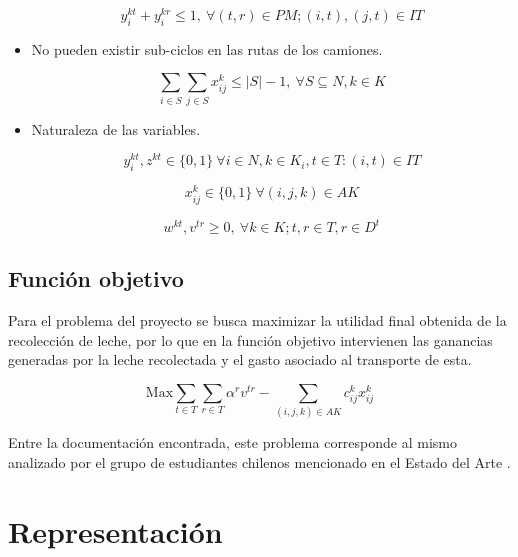 \documentclass[letter, 10pt]{article}
\begin{document}
\begin{itemize}
     \begin{equation}
         y^{kt}_i + y^{kr}_i \leq 1, \: \forall (t,r) \in PM; (i,t),(j,t) \in IT
     \end{equation}
     
     \item No pueden existir sub-ciclos en las rutas de los camiones.
     
     \begin{equation}
         \sum_{i \in S} \sum_{j \in S} x^k_{ij} \leq |S| - 1, \: \forall S \subseteq N, k \in K
     \end{equation}
     
     \item Naturaleza de las variables.
     
     \begin{equation}
         y^{kt}_i, z^{kt} \in \{0,1\} \: \forall i \in N, k \in K_i, t \in T : (i,t) \in IT
     \end{equation}
     
     \begin{equation}
         x^k_{ij} \in \{0,1\} \: \forall (i,j,k) \in AK
     \end{equation}
     
     \begin{equation}
         w^{kt}, v^{tr} \geq 0, \: \forall k \in K; t, r \in T, r \in D^t
     \end{equation}
\end{itemize}

\subsection{Funci\'on objetivo}

Para el problema del proyecto se busca maximizar la utilidad final obtenida de la recolecci\'on de leche, por lo que en la funci\'on objetivo intervienen las ganancias generadas por la leche recolectada y el gasto asociado al transporte de esta.

\begin{equation*}
    \text{Max} \sum_{t \in T} \sum_{r \in T} \alpha^r v^{tr} - \sum_{(i,j,k) \in AK} c^k_{ij} x^k_{ij}
\end{equation*}

Entre la documentaci\'on encontrada, este problema corresponde al mismo analizado por el grupo de estudiantes chilenos mencionado en el Estado del Arte \cite{MCPB}.


\section{Representaci\'on}
\end{document}
